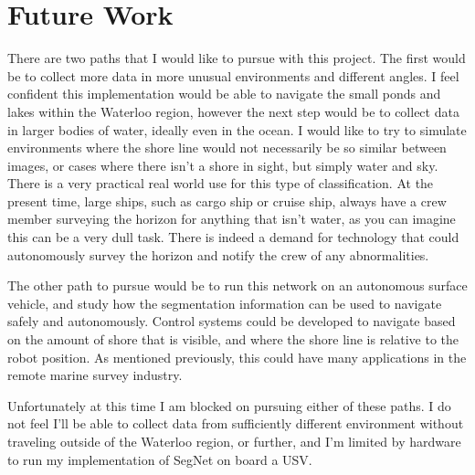 \documentclass[10pt,twocolumn,letterpaper]{article}
\begin{document}
\section{Future Work}
There are two paths that I would like to pursue with this project. The first would be to collect more data in more unusual environments and different angles. I feel confident this implementation would be able to navigate the small ponds and lakes within the Waterloo region, however the next step would be to collect data in larger bodies of water, ideally even in the ocean. I would like to try to simulate environments where the shore line would not necessarily be so similar between images, or cases where there isn't a shore in sight, but simply water and sky. There is a very practical real world use for this type of classification. At the present time, large ships, such as cargo ship or cruise ship, always have a crew member surveying the horizon for anything that isn't water, as you can imagine this can be a very dull task. There is indeed a demand for technology that could autonomously survey the horizon and notify the crew of any abnormalities.

The other path to pursue would be to run this network on an autonomous surface vehicle, and study how the segmentation information can be used to navigate safely and autonomously. Control systems could be developed to navigate based on the amount of shore that is visible, and where the shore line is relative to the robot position. As mentioned previously, this could have many applications in the remote marine survey industry.

Unfortunately at this time I am blocked on pursuing either of these paths. I do not feel I'll be able to collect data from sufficiently different environment without traveling outside of the Waterloo region, or further, and I'm limited by hardware to run my implementation of SegNet on board a USV.
\end{document}
